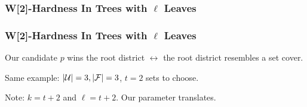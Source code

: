 \begin{frame}[t]
    \frametitle{W[2]-Hardness In Trees with $\ell$ Leaves}

    \begin{figure}
		\begin{center}
			
		\end{center}
	\end{figure}

    \begin{figure}
		\begin{center}
			
		\end{center}
	\end{figure}
\end{frame}

\begin{frame}
    \frametitle{W[2]-Hardness In Trees with $\ell$ Leaves}
    \begin{itemize}
        \item Our candidate $p$ wins the root district $\leftrightarrow$ the root district resembles a set cover.
         {
            \item Same example: $|\mathcal{U}| = 3, |\mathcal{F}| = 3$, $t = 2$ sets to choose.
        }
         {
            \item Note: $k=t+2$ and $\ell = t+2$. Our parameter translates.
        }
    \end{itemize}

    \begin{figure}
		\begin{center}
			
		\end{center}
	\end{figure}
\end{frame}


    
